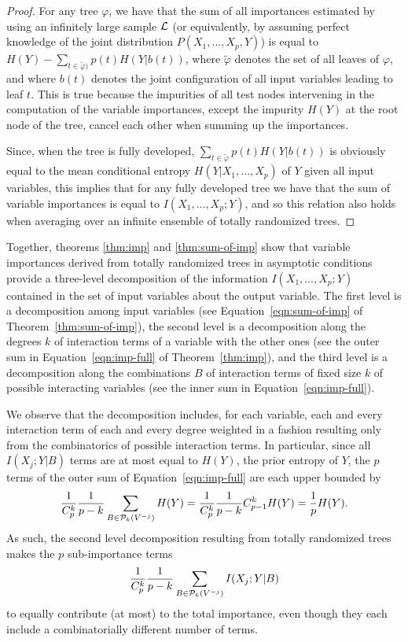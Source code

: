 \begin{proof}
For any tree $\varphi$, we have that the sum of all importances estimated by
using an infinitely large sample $\cal L$ (or equivalently, by assuming perfect
knowledge of the joint distribution $P(X_1, ..., X_p, Y)$) is equal to $H(Y) -
\sum_{t \in \widetilde{\varphi})} p(t) H(Y|b(t))$, where $\widetilde{\varphi}$
denotes the set of all leaves of $\varphi$, and where $b(t)$  denotes the joint
configuration of all input variables leading to leaf $t$. This is true because
the impurities of all test nodes intervening in the computation of the variable
importances, except the impurity $H(Y)$ at the root node of the tree, cancel
each other when summing up the importances.

Since, when the tree is fully developed, $\sum_{t \in \widetilde{\varphi}} p(t)
H(Y|b(t))$ is obviously equal to the mean conditional entropy $H(Y | X_{1},
\ldots, X_{p})$ of $Y$ given all input variables, this implies that for any
fully developed tree we have that the sum of variable importances is equal to
$I(X_{1}, \ldots, X_{p} ; Y)$, and so this relation also holds when averaging
over an infinite ensemble of totally randomized trees.
\end{proof}

Together, theorems \ref{thm:imp} and \ref{thm:sum-of-imp} show that  variable
importances derived from totally randomized trees in asymptotic conditions
provide a three-level decomposition of the information $I(X_{1}, \ldots, X_{p}
; Y)$ contained in the set of input variables about the output variable. The
first level is a decomposition among input variables (see Equation~\ref{eqn:sum-of-imp}
of Theorem~\ref{thm:sum-of-imp}),  the second level is a
decomposition along the degrees $k$ of interaction terms of a variable with the
other ones (see the outer sum in Equation~\ref{eqn:imp-full} of
Theorem~\ref{thm:imp}), and the third level is a decomposition along the
combinations $B$ of interaction terms of fixed size $k$ of possible interacting
variables (see the inner sum in Equation~\ref{eqn:imp-full}).

We observe that the decomposition includes, for each variable, each and every
interaction term of each and every degree weighted in a fashion resulting only
from the combinatorics of possible interaction terms. In particular, since all
$I(X_j;Y|B)$ terms are at most equal to $H(Y)$, the prior entropy of $Y$,  the
$p$ terms of the outer sum of Equation~\ref{eqn:imp-full} are each upper
bounded by
\begin{equation}
\frac{1}{C^k_p}\frac{1}{p-k}\sum_{B \in {\cal P}_k(V^{-j})}
H(Y)=\frac{1}{C^k_p} \frac{1}{p-k} {C^k_{p-1}} H(Y) = \frac{1}{p}H(Y).
\end{equation}
As such,
the second level decomposition resulting from totally randomized trees makes the
$p$ sub-importance terms
\begin{equation}
\frac{1}{C^k_p} \frac{1}{p-k} \sum_{B \in {\cal P}_k(V^{-j})} I(X_j;Y|B)
\end{equation}
to equally contribute (at most) to the total
importance, even though they each include a combinatorially different number of
terms.


